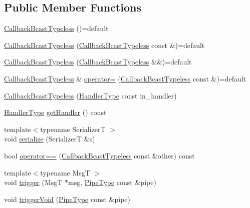 \subsection*{Public Member Functions}
\begin{DoxyCompactItemize}
\item 
\hyperlink{structvt_1_1pipe_1_1callback_1_1_callback_bcast_typeless_a4f41ee712c6d8359f2702731cdb508e0}{Callback\+Bcast\+Typeless} ()=default
\item 
\hyperlink{structvt_1_1pipe_1_1callback_1_1_callback_bcast_typeless_a21bda4efe28c82f442bf0881b1148196}{Callback\+Bcast\+Typeless} (\hyperlink{structvt_1_1pipe_1_1callback_1_1_callback_bcast_typeless}{Callback\+Bcast\+Typeless} const \&)=default
\item 
\hyperlink{structvt_1_1pipe_1_1callback_1_1_callback_bcast_typeless_a47d8224353671c6a7769abaed3a032ed}{Callback\+Bcast\+Typeless} (\hyperlink{structvt_1_1pipe_1_1callback_1_1_callback_bcast_typeless}{Callback\+Bcast\+Typeless} \&\&)=default
\item 
\hyperlink{structvt_1_1pipe_1_1callback_1_1_callback_bcast_typeless}{Callback\+Bcast\+Typeless} \& \hyperlink{structvt_1_1pipe_1_1callback_1_1_callback_bcast_typeless_acad87bb1887561979d41c298896463e3}{operator=} (\hyperlink{structvt_1_1pipe_1_1callback_1_1_callback_bcast_typeless}{Callback\+Bcast\+Typeless} const \&)=default
\item 
\hyperlink{structvt_1_1pipe_1_1callback_1_1_callback_bcast_typeless_abb9b3494599676f76f6889490edffc72}{Callback\+Bcast\+Typeless} (\hyperlink{namespacevt_af64846b57dfcaf104da3ef6967917573}{Handler\+Type} const in\+\_\+handler)
\item 
\hyperlink{namespacevt_af64846b57dfcaf104da3ef6967917573}{Handler\+Type} \hyperlink{structvt_1_1pipe_1_1callback_1_1_callback_bcast_typeless_a15f773a711d9771b8c60683de2762bc8}{get\+Handler} () const
\item 
{\footnotesize template$<$typename SerializerT $>$ }\\void \hyperlink{structvt_1_1pipe_1_1callback_1_1_callback_bcast_typeless_ad8a8822a82d979df798f8dcb57c8c4e6}{serialize} (SerializerT \&s)
\item 
bool \hyperlink{structvt_1_1pipe_1_1callback_1_1_callback_bcast_typeless_a38b71fafbb0f2e6ce000eaa5faec463c}{operator==} (\hyperlink{structvt_1_1pipe_1_1callback_1_1_callback_bcast_typeless}{Callback\+Bcast\+Typeless} const \&other) const
\item 
{\footnotesize template$<$typename MsgT $>$ }\\void \hyperlink{structvt_1_1pipe_1_1callback_1_1_callback_bcast_typeless_a6a23e27691ce2e3789e5a5dc1a88ae0f}{trigger} (MsgT $\ast$msg, \hyperlink{namespacevt_ac9852acda74d1896f48f406cd72c7bd3}{Pipe\+Type} const \&pipe)
\item 
void \hyperlink{structvt_1_1pipe_1_1callback_1_1_callback_bcast_typeless_a4f46128a5ef56035c6e2874b5387907d}{trigger\+Void} (\hyperlink{namespacevt_ac9852acda74d1896f48f406cd72c7bd3}{Pipe\+Type} const \&pipe)
\end{DoxyCompactItemize}
